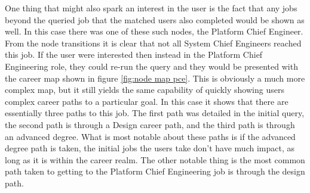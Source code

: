 One thing that might also spark an interest in the user is the fact that any
jobs beyond the queried job that the matched users also completed would be shown
as well.  In this case there was one of these such nodes, the Platform Chief
Engineer.  From the node transitions it is clear that not all System Chief
Engineers reached this job.  If the user were interested then instead in the
Platform Chief Engineering role, they could re-run the query and they would be
presented with the career map shown in figure \ref{fig:node map pce}.  This is
obviously a much more complex map, but it still yields the same capability of
quickly showing users complex career paths to a particular goal.  In this case
it shows that there are essentially three paths to this job.  The first path was
detailed in the initial query, the second path is through a Design career
path, and the third path is through an advanced degree.  What is most notable
about these paths is if the advanced degree path is taken, the initial jobs
the users take don't have much impact, as long as it is within the career realm.
The other notable thing is the most common path taken to getting to the Platform
Chief Engineering job is through the design path.


\usetikzlibrary{shapes,arrows,chains}

